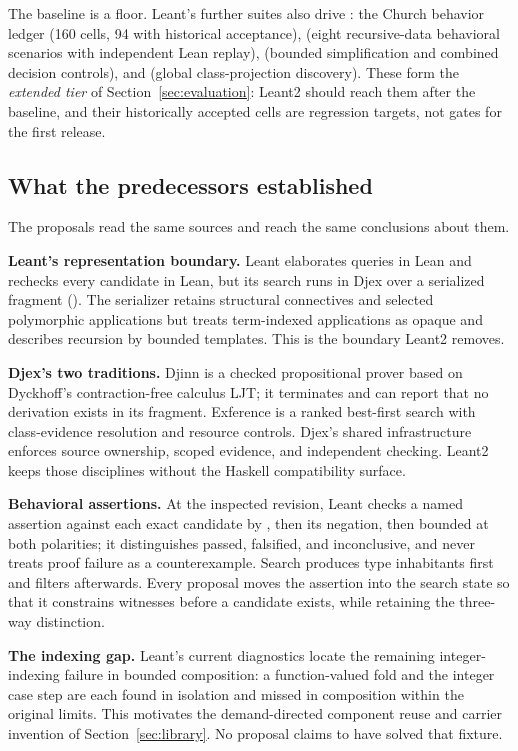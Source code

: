 The baseline is a floor. Leant's further suites also drive : the Church behavior ledger (160 cells, 94 with historical acceptance),  (eight recursive-data behavioral scenarios with independent Lean replay),  (bounded simplification and combined decision controls), and  (global class-projection discovery). These form the \emph{extended tier} of Section~\ref{sec:evaluation}: Leant2 should reach them after the baseline, and their historically accepted cells are regression targets, not gates for the first release.

\subsection{What the predecessors established}\label{sec:predecessors}

The proposals read the same sources and reach the same conclusions about them.

\textbf{Leant's representation boundary.} Leant elaborates queries in Lean and rechecks every candidate in Lean, but its search runs in Djex over a serialized fragment (). The serializer retains structural connectives and selected polymorphic applications but treats term-indexed applications as opaque and describes recursion by bounded templates. This is the boundary Leant2 removes.

\textbf{Djex's two traditions.} Djinn is a checked propositional prover based on Dyckhoff's contraction-free calculus LJT; it terminates and can report that no derivation exists in its fragment. Exference is a ranked best-first search with class-evidence resolution and resource controls. Djex's shared infrastructure enforces source ownership, scoped evidence, and independent checking. Leant2 keeps those disciplines without the Haskell compatibility surface.

\textbf{Behavioral assertions.} At the inspected revision, Leant checks a named assertion against each exact candidate by , then its negation, then bounded  at both polarities; it distinguishes passed, falsified, and inconclusive, and never treats proof failure as a counterexample. Search produces type inhabitants first and filters afterwards. Every proposal moves the assertion into the search state so that it constrains witnesses before a candidate exists, while retaining the three-way distinction.

\textbf{The indexing gap.} Leant's current diagnostics locate the remaining integer-indexing failure in bounded composition: a function-valued fold and the integer case step are each found in isolation and missed in composition within the original limits. This motivates the demand-directed component reuse and carrier invention of Section~\ref{sec:library}. No proposal claims to have solved that fixture.

